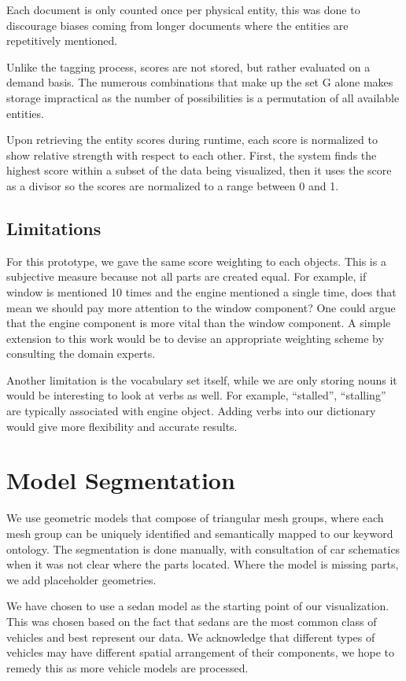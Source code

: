 Each document is only counted once per physical entity, this was done to
discourage biases coming from longer documents where the entities are
repetitively mentioned.

Unlike the tagging process, scores are not stored, but rather
evaluated on a demand basis. The numerous combinations that make up the set G
alone makes storage impractical as the number of possibilities is a permutation
of all available entities.
 
Upon retrieving the entity scores during runtime, each score is normalized
to show relative strength with respect to each other. First, the system finds
the highest score within a subset of the data being visualized, then it uses the
score as a divisor so the scores are normalized to a range between 0 and 1.

  
\subsection{Limitations} 
For this prototype, we gave the same score weighting to each objects. This is a 
subjective measure because not all parts are created equal. For example, if window 
is mentioned 10 times and the engine mentioned a single time, does that mean we 
should pay more attention to the window component? One could argue that the engine 
component is more vital than the window component. A simple extension to this
work would be to devise an appropriate weighting scheme by consulting the domain
experts. 

Another limitation is the vocabulary set itself, while we are only storing nouns
it would be interesting to look at verbs as well. For example, ``stalled'',
``stalling'' are typically associated with engine object. Adding verbs into our
dictionary would give more flexibility and accurate results.


\section{Model Segmentation}
We use geometric models that compose of triangular mesh groups, where each mesh 
group can be uniquely identified and semantically mapped to our keyword ontology. 
The segmentation is done manually, with consultation of car schematics when it 
was not clear where the parts located. Where the model is missing parts, 
we add placeholder geometries.

We have chosen to use a sedan model as the starting point of our visualization. 
This was chosen based on the fact that sedans are the most common class of 
vehicles and best represent our data. We acknowledge that different types of 
vehicles may have different spatial arrangement of their components, we hope to 
remedy this as more vehicle models are processed.

